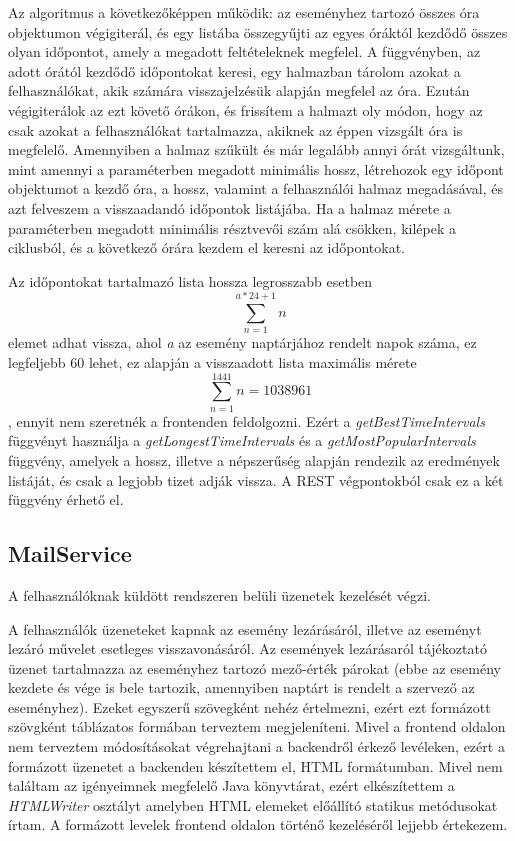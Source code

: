 \documentclass[a4paper,12pt]{report}
\theoremstyle{definition}
\theoremstyle{remark}
\begin{document}
Az algoritmus a következőképpen működik: az eseményhez tartozó összes óra objektumon végigiterál, és egy listába összegyűjti az egyes óráktól kezdődő összes olyan időpontot, amely a megadott feltételeknek megfelel. A függvényben, az adott órától kezdődő időpontokat keresi, egy halmazban tárolom azokat a felhasználókat, akik számára visszajelzésük alapján megfelel az óra. Ezután végigiterálok az ezt követő órákon, és frissítem a halmazt oly módon, hogy az csak azokat a felhasználókat tartalmazza, akiknek az éppen vizsgált óra is megfelelő. Amennyiben a halmaz szűkült és már legalább annyi órát vizsgáltunk, mint amennyi a paraméterben megadott minimális hossz, létrehozok egy időpont objektumot a kezdő óra, a hossz, valamint a felhasználói halmaz megadásával, és azt felveszem a visszaadandó időpontok listájába. Ha a halmaz mérete a paraméterben megadott minimális résztvevői szám alá csökken, kilépek a ciklusból, és a következő órára kezdem el keresni az időpontokat.

Az időpontokat tartalmazó lista hossza legrosszabb esetben
\begin{equation} \label{eq:eq1}
\sum_{n=1}^{a*24+1} {n}
\end{equation}
elemet adhat vissza, ahol \textit{a} az esemény naptárjához rendelt napok száma, ez legfeljebb 60 lehet, ez alapján a visszaadott lista maximális mérete
\begin{equation} \label{eq:eq2}
 \sum_{n=1}^{1441} {n} = 1 038 961
\end{equation}
, ennyit nem szeretnék a frontenden feldolgozni. Ezért a \textit{getBestTimeIntervals} függvényt használja a \textit{getLongestTimeIntervals} és a \textit{getMostPopularIntervals} függvény, amelyek a hossz, illetve a népszerűség alapján rendezik az eredmények listáját, és csak a legjobb tizet adják vissza. A REST végpontokból csak ez a két függvény érhető el.

\subsection{MailService}

A felhasználóknak küldött rendszeren belüli üzenetek kezelését végzi.

A felhasználók üzeneteket kapnak az esemény lezárásáról, illetve az eseményt lezáró művelet esetleges visszavonásáról. Az események lezárásaról tájékoztató üzenet tartalmazza az eseményhez tartozó mező-érték párokat (ebbe az esemény kezdete és vége is bele tartozik, amennyiben naptárt is rendelt a szervező az eseményhez). Ezeket egyszerű szövegként nehéz értelmezni, ezért ezt formázott szövgként táblázatos formában terveztem megjeleníteni. Mivel a frontend oldalon nem terveztem módosításokat végrehajtani a backendről érkező levéleken, ezért a formázott üzenetet a backenden készítettem el, HTML formátumban. Mivel nem találtam az igényeimnek megfelelő Java könyvtárat, ezért elkészítettem a \textit{HTMLWriter} osztályt amelyben HTML elemeket előállító statikus metódusokat írtam. A formázott levelek frontend oldalon történő kezeléséről lejjebb értekezem.
\end{document}
